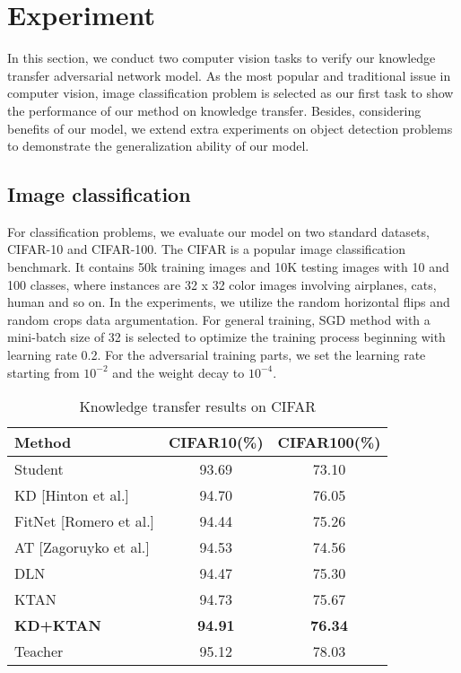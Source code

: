 \documentclass[letterpaper]{article} %
\begin{document}
\section{Experiment}

In this section, we conduct two computer vision tasks to verify our knowledge transfer adversarial network model. As the most popular and traditional issue in computer vision, image classification problem is selected as our first task to show the performance of our method on knowledge transfer. Besides, considering benefits of our model, we extend extra experiments on object detection problems to demonstrate the generalization ability of our model.

\subsection{Image classification}

For classification problems, we evaluate our model on two standard datasets, CIFAR-10 and CIFAR-100. The CIFAR is a popular image classification benchmark. It contains 50k training images and 10K testing images with 10 and 100 classes, where instances are 32 x 32 color images involving airplanes, cats, human and so on. In the experiments, we utilize the random horizontal flips and random crops data argumentation. For general training, SGD method with a mini-batch size of 32 is selected to optimize the training process beginning with learning rate 0.2. For the adversarial training parts, we set the learning rate starting from $10^{-2}$ and the weight decay to $10^{-4}$.

\begin{table}[htb!]
	\centering
	\caption{Knowledge transfer results on CIFAR}
	\begin{tabular}{lcc}
		\hline
		\textbf{Method} & \textbf{CIFAR10(\%)} & \textbf{CIFAR100(\%)} \\
		\hline
		Student & 93.69 & 73.10  \\
		KD [Hinton et al.] & 94.70  & 76.05  \\
		FitNet [Romero et al.] & 94.44  & 75.26  \\
		AT [Zagoruyko et al.] & 94.53  &  74.56 \\
		DLN & 94.47  &  75.30 \\
		KTAN & 94.73  &  75.67 \\
		\textbf{KD+KTAN} & \textbf{94.91}  &  \textbf{76.34} \\
		\hline
		Teacher & 95.12  & 78.03  \\
		\hline
	\end{tabular}
\end{table}
\end{document}
